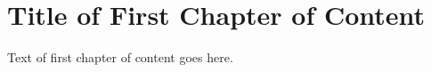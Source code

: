 \chapter{Title of First Chapter of Content}
\label{chap:one}

Text of first chapter of content goes here.